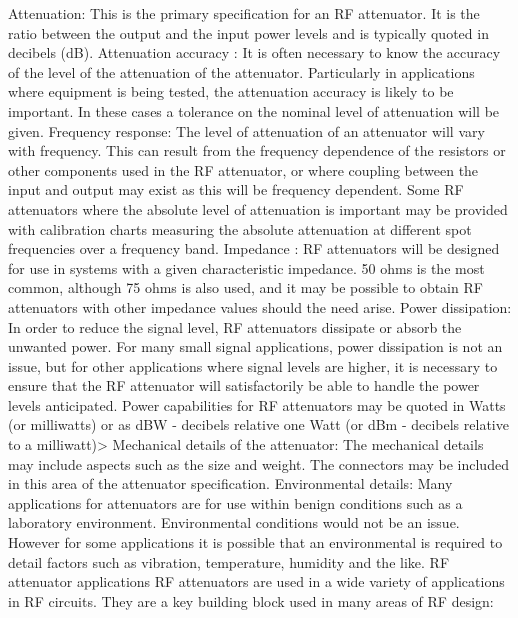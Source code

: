 Attenuation:   This is the primary specification for an RF attenuator. It is the ratio between the output and the input power levels and is typically quoted in decibels (dB).
Attenuation accuracy :   It is often necessary to know the accuracy of the level of the attenuation of the attenuator. Particularly in applications where equipment is being tested, the attenuation accuracy is likely to be important. In these cases a tolerance on the nominal level of attenuation will be given.
Frequency response:   The level of attenuation of an attenuator will vary with frequency. This can result from the frequency dependence of the resistors or other components used in the RF attenuator, or where coupling between the input and output may exist as this will be frequency dependent. Some RF attenuators where the absolute level of attenuation is important may be provided with calibration charts measuring the absolute attenuation at different spot frequencies over a frequency band.
Impedance :   RF attenuators will be designed for use in systems with a given characteristic impedance. 50 ohms is the most common, although 75 ohms is also used, and it may be possible to obtain RF attenuators with other impedance values should the need arise.
Power dissipation:   In order to reduce the signal level, RF attenuators dissipate or absorb the unwanted power. For many small signal applications, power dissipation is not an issue, but for other applications where signal levels are higher, it is necessary to ensure that the RF attenuator will satisfactorily be able to handle the power levels anticipated. Power capabilities for RF attenuators may be quoted in Watts (or milliwatts) or as dBW - decibels relative one Watt (or dBm - decibels relative to a milliwatt)>
Mechanical details of the attenuator:   The mechanical details may include aspects such as the size and weight. The connectors may be included in this area of the attenuator specification.
Environmental details:   Many applications for attenuators are for use within benign conditions such as a laboratory environment. Environmental conditions would not be an issue. However for some applications it is possible that an environmental is required to detail factors such as vibration, temperature, humidity and the like.
RF attenuator applications
RF attenuators are used in a wide variety of applications in RF circuits. They are a key building block used in many areas of RF design:

